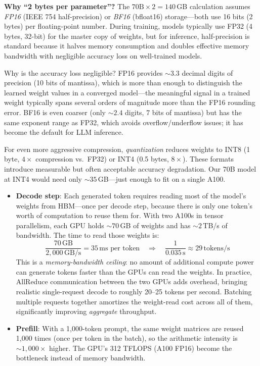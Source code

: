 \begin{notebox}
\textbf{Why ``2 bytes per parameter''?} The $70\text{B} \times 2 = 140$\,GB calculation assumes \emph{FP16} (IEEE 754 half-precision) or \emph{BF16} (bfloat16) storage---both use 16 bits (2 bytes) per floating-point number. During training, models typically use FP32 (4 bytes, 32-bit) for the master copy of weights, but for inference, half-precision is standard because it halves memory consumption and doubles effective memory bandwidth with negligible accuracy loss on well-trained models.

Why is the accuracy loss negligible? FP16 provides ${\sim}3.3$ decimal digits of precision (10 bits of mantissa), which is more than enough to distinguish the learned weight values in a converged model---the meaningful signal in a trained weight typically spans several orders of magnitude more than the FP16 rounding error. BF16 is even coarser (only ${\sim}2.4$ digits, 7 bits of mantissa) but has the same exponent range as FP32, which avoids overflow/underflow issues; it has become the default for LLM inference.

For even more aggressive compression, \emph{quantization} reduces weights to INT8 (1 byte, $4\times$ compression vs.\ FP32) or INT4 (0.5 bytes, $8\times$). These formats introduce measurable but often acceptable accuracy degradation.\footnotemark{} Our 70B model at INT4 would need only ${\sim}35$\,GB---just enough to fit on a single A100.
\end{notebox}

\begin{itemize}
    \item \textbf{Decode step}: Each generated token requires reading most of the model's weights from HBM---once per decode step, because there is only one token's worth of computation to reuse them for. With two A100s in tensor parallelism, each GPU holds ${\sim}70$\,GB of weights and has ${\sim}2$\,TB/s of bandwidth. The time to read those weights is:
    \[
    \frac{70\,\text{GB}}{2{,}000\,\text{GB/s}} = 35\,\text{ms per token} \quad \Longrightarrow \quad \frac{1}{0.035\,\text{s}} \approx 29\,\text{tokens/s}
    \]
    This is a \emph{memory-bandwidth ceiling}: no amount of additional compute power can generate tokens faster than the GPUs can read the weights. In practice, AllReduce communication between the two GPUs adds overhead, bringing realistic single-request decode to roughly 20--25 tokens per second. Batching multiple requests together amortizes the weight-read cost across all of them, significantly improving \emph{aggregate} throughput.

    \item \textbf{Prefill}: With a 1,000-token prompt, the same weight matrices are reused 1,000 times (once per token in the batch), so the arithmetic intensity is ${\sim}1{,}000\times$ higher. The GPU's 312 TFLOPS (A100 FP16) become the bottleneck instead of memory bandwidth.
\end{itemize}

